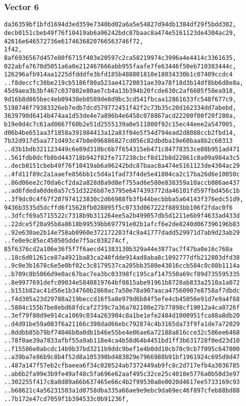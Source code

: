 \documentclass[
]{article}
\begin{document}
\hypertarget{vector-6-2}{%
\subsubsection{Vector 6}\label{vector-6-2}}

\begin{verbatim}
da36359bf1bfd1694d3ed359e7340bd02a6a5e54827d94db1384df29f5bdd302,
decb0151cbeb49f76f10419ab6a96242bdc87baac8a474e5161123de4304ac29,
42616e646572736e6174636820766563746f72,
1f42,
8af6936567d457e80f6715f403e20597c2ca58219974c3996a4e4414c3361635,
022abfa7670d5051a6a0e212467666abb955faafe7fe63446f50eb710383444c,
126296afb914aa1225dfdddfe3bfd185b488801810e18034330b1c07409ccdc4
..f8deccfc30be219cb5186f80a523ae41720031ae39a78f18d3b14df8bb6d8e8a,
45d9aea3b3bf467c037802e80ae7cb4a13b394b20fcde630c2af6605f58ea918,
9d16b8d865bec4eb09438eb0589de8d9bc3cd541fbcaa12861633fc548f677c9,
5198746f79383326eb7edb7dcd579772451f42f2c73b35c20d162334dd7abebd,
3639790d6414b474aa1d53de4e7a896b4e6458c078867acd22200f00f20f280a,
b19e0d4c7c61ad0667f60b2e51d2555139a0e511800f92c15ec44eee2a547005,
d06b4be651aa3f1858a391984413a12a83f04e5f54d794ead2d8088ccb2fbd14,
7b32d917d5aa771d493c47b0e096886827cd056c82dbdba19e60baa8b2c60313
..d3b1bdb321123449c6e89d310bc6b7f654315eb471c84778353ce08b951ad471
..561fdb0dcfb8bd443718b942f82fe717238cbcf8d12b8d22861c8a09a984a3c5
..decb0151cbeb49f76f10419ab6a96242bdc87baac8a474e5161123de4304ac29
..4fd11f89c2a1aaefe856bb1c5d4a1fad73f4de5e41804ca2c17ba26d6e10050c
..86d06ee2c70da6cf2da2a828d8a9d8ef755ad6e580e838359a10accb086ae437
..ad6fdeda0dde0a57c51d3226b87e3795e6474393772da46101fd597fbd456c1b
..3f9dc0c4f67f207974123830c2d66988fb3fb44becbbba5a64143f376edc51d9,
9436b3535d5dcffd6f15628fb028095f5c0733d067222f8893bb106f2fdac0f6
..3dfcf69a5715522c7318b9b311264ee5a2b499057db5d1211e6b9f4633ad433d
..22dce5f20a95b8a8618b99539bb697791e02b1afcf6e2de8240d067396196b83
..92e630ae2b14e758ab0960e372172203f4c9a41777dadd529971d7ab9d23ab29
..fe0e9c85ec450505dde7f5ac038274cf,
85f6376cd2a106e36f5f7f6aecd41383130b329a44e3877ac7f47ba0e16c768a
..18c6d01261ce87a4921ba83ca240fdde914ad8aba8c1092777dfb212803dfd38
..9c0e3b1678c6e5e0bf02c3c8179537ca205bb3580e43016ccb584c0c08b1114a
..b709c8b5066d9e0ac67bac7ea3bc03398fc195caf147550a69cf89d735595335
..8e9977691defc09034e5840819764bf0815abe91961b8728ab833a2510a1a072
..b151b82ac41d56e1b34760b2860ac7a50e78a907aaca47560907e8758af7dbdc
..f4d305a23d29788a219beccd16f5a8e979d6b84f5efe4cb45056e91d7e9a4f68
..5804c155b7be8ebd68fdcaf2739c7a36a702100e27b77898cf19012a4ca0726f
..3ef79f80d9e914ca1069c034a263904c8a1be1efe2484d1000951fca88a8db20
..d4d91be59a083f6a21166c398dad66ebc792874c4b3165da73f9fa1de7a72029
..0ddbb85b79bf74046b0a0db1b46e55be4e06ae6a72188a816cce32c586ee6468
..78f0ae39a7833afbf55a9ab118e4ca4b58d64b4451bd1ff3b631728f0ed23d10
..f15586e0abcdc14b9b37bd3211b9ddc9bef1e4b0dd10cb70c9cb7f095c647000
..a39ba7e86b9c8b4f52d8a105390bd483829e7966988b91bf1961924c695d9d47
..487a147f57eb2cfbaeea6f34c020524ab7372449ab9fc8c2d717efb4a3036785
..ab6b2fa99e3b9fe49af48c5fa696e62aaf495c32ce25c4010e5776a0b50d3e97
..302255f417c8a8d89a66b637465e66c4b2f99530a8e0020d4617ee5733169c93
..b68621c4a56231503a1d0758dba335a66ae9e9ebc9da69ec46f897cfeb88bd88
..7b172e47cd7059f1b394533c0b91236f,
\end{verbatim}
\end{document}
